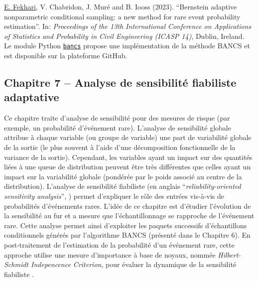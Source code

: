 \noindent
{} \underline{E. Fekhari}, V. Chabridon, J. Muré and B. Iooss (2023). ``Bernstein adaptive nonparametric conditional sampling: a new method for rare event probability estimation''. In: \textit{Proceedings of the 13th International Conference on Applications of Statistics and Probability in Civil Engineering (ICASP 14)}, Dublin, Ireland.\\

\noindent
{} Le module Python \href{https://github.com/efekhari27/bancs}{\texttt{bancs}} propose une implémentation de la méthode BANCS et est disponible sur la plateforme GitHub. 

\subsection*{Chapitre 7 -- Analyse de sensibilité fiabiliste adaptative}

Ce chapitre traite d'analyse de sensibilité pour des mesures de risque (par exemple, un probabilité d'événement rare). 
L'analyse de sensibilité globale \cite{daveiga_iooss_2021} attribue à chaque variable (ou groupe de variable) une part de variabilité globale de la sortie (le plus souvent à l'aide d'une décomposition fonctionnelle de la variance de la sortie). 
Cependant, les variables ayant un impact sur des quantités liées à une queue de distribution peuvent être très différentes que celles ayant un impact sur la variabilité globale (pondérée par le poids associé au centre de la distribution). 
L'analyse de sensibilité fiabiliste (en anglais ``\textit{reliability-oriented sensitivity analysis}'', \cite{chabridon_2018_thesis}) permet d'expliquer le rôle des entrées vis-à-vis de probabilités d'événements rares. 
L'idée de ce chapitre est d'étudier l'évolution de la sensibilité au fur et a mesure que l'échantillonnage se rapproche de l'événement rare. 
Cette analyse permet ainsi d'exploiter les paquets successifs d'échantillons conditionnels générés par l'algorithme BANCS (présenté dans le Chapitre 6). 
En post-traitement de l'estimation de la probabilité d'un événement rare, cette approche utilise une mesure d'importance à base de noyaux, nommée \textit{Hilbert-Schmidt Indepencence Criterion}, pour évaluer la dynamique de la sensibilité fiabiliste \cite{marrel_chabridon_2021}.

